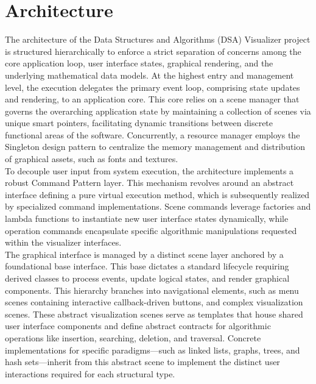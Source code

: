 \section {Architecture}

The architecture of the Data Structures and Algorithms (DSA) Visualizer project is structured hierarchically to enforce a strict separation of concerns among the core application loop, user interface states, graphical rendering, and the underlying mathematical data models. At the highest entry and management level, the execution delegates the primary event loop, comprising state updates and rendering, to an application core. This core relies on a scene manager that governs the overarching application state by maintaining a collection of scenes via unique smart pointers, facilitating dynamic transitions between discrete functional areas of the software. Concurrently, a resource manager employs the Singleton design pattern to centralize the memory management and distribution of graphical assets, such as fonts and textures.\\

To decouple user input from system execution, the architecture implements a robust Command Pattern layer. This mechanism revolves around an abstract interface defining a pure virtual execution method, which is subsequently realized by specialized command implementations. Scene commands leverage factories and lambda functions to instantiate new user interface states dynamically, while operation commands encapsulate specific algorithmic manipulations requested within the visualizer interfaces.\\

The graphical interface is managed by a distinct scene layer anchored by a foundational base interface. This base dictates a standard lifecycle requiring derived classes to process events, update logical states, and render graphical components. This hierarchy branches into navigational elements, such as menu scenes containing interactive callback-driven buttons, and complex visualization scenes. These abstract visualization scenes serve as templates that house shared user interface components and define abstract contracts for algorithmic operations like insertion, searching, deletion, and traversal. Concrete implementations for specific paradigms---such as linked lists, graphs, trees, and hash sets---inherit from this abstract scene to implement the distinct user interactions required for each structural type.\\

